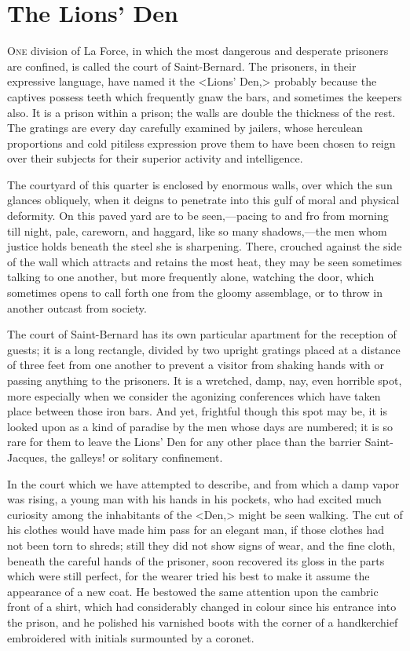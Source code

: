 \chapter{The Lions' Den}

 \lettrine{O}{ne} division of La Force, in which the most dangerous and desperate prisoners are confined, is called the court of Saint-Bernard. The prisoners, in their expressive language, have named it the <Lions' Den,> probably because the captives possess teeth which frequently gnaw the bars, and sometimes the keepers also. It is a prison within a prison; the walls are double the thickness of the rest. The gratings are every day carefully examined by jailers, whose herculean proportions and cold pitiless expression prove them to have been chosen to reign over their subjects for their superior activity and intelligence. 

 The courtyard of this quarter is enclosed by enormous walls, over which the sun glances obliquely, when it deigns to penetrate into this gulf of moral and physical deformity. On this paved yard are to be seen,—pacing to and fro from morning till night, pale, careworn, and haggard, like so many shadows,—the men whom justice holds beneath the steel she is sharpening. There, crouched against the side of the wall which attracts and retains the most heat, they may be seen sometimes talking to one another, but more frequently alone, watching the door, which sometimes opens to call forth one from the gloomy assemblage, or to throw in another outcast from society. 

 The court of Saint-Bernard has its own particular apartment for the reception of guests; it is a long rectangle, divided by two upright gratings placed at a distance of three feet from one another to prevent a visitor from shaking hands with or passing anything to the prisoners. It is a wretched, damp, nay, even horrible spot, more especially when we consider the agonizing conferences which have taken place between those iron bars. And yet, frightful though this spot may be, it is looked upon as a kind of paradise by the men whose days are numbered; it is so rare for them to leave the Lions' Den for any other place than the barrier Saint-Jacques, the galleys! or solitary confinement. 

 In the court which we have attempted to describe, and from which a damp vapor was rising, a young man with his hands in his pockets, who had excited much curiosity among the inhabitants of the <Den,> might be seen walking. The cut of his clothes would have made him pass for an elegant man, if those clothes had not been torn to shreds; still they did not show signs of wear, and the fine cloth, beneath the careful hands of the prisoner, soon recovered its gloss in the parts which were still perfect, for the wearer tried his best to make it assume the appearance of a new coat. He bestowed the same attention upon the cambric front of a shirt, which had considerably changed in colour since his entrance into the prison, and he polished his varnished boots with the corner of a handkerchief embroidered with initials surmounted by a coronet. 

